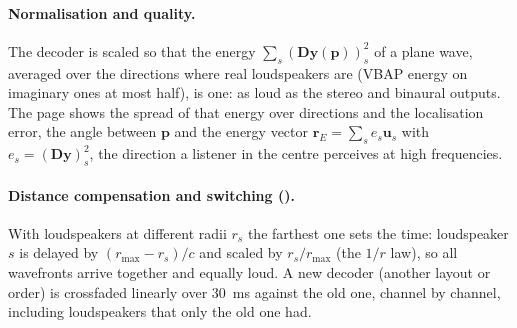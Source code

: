 \paragraph{Normalisation and quality.} The decoder is scaled so that the energy $\sum_s(\mathbf D\mathbf y(\mathbf p))_s^2$
of a plane wave, averaged over the directions where real loudspeakers are (VBAP energy on imaginary ones at most half),
is one: as loud as the stereo and binaural outputs. The page shows the spread of that energy over directions and the
localisation error, the angle between $\mathbf p$ and the energy vector $\mathbf r_E = \sum_s e_s\mathbf u_s$ with
$e_s = (\mathbf D\mathbf y)_s^2$, the direction a listener in the centre perceives at high frequencies.

\paragraph{Distance compensation and switching ().} With loudspeakers at different radii $r_s$
the farthest one sets the time: loudspeaker $s$ is delayed by $(r_\mathrm{max}-r_s)/c$ and scaled by $r_s/r_\mathrm{max}$
(the $1/r$ law), so all wavefronts arrive together and equally loud. A new decoder (another layout or order) is
crossfaded linearly over \SI{30}{ms} against the old one, channel by channel, including loudspeakers that only the old
one had.
